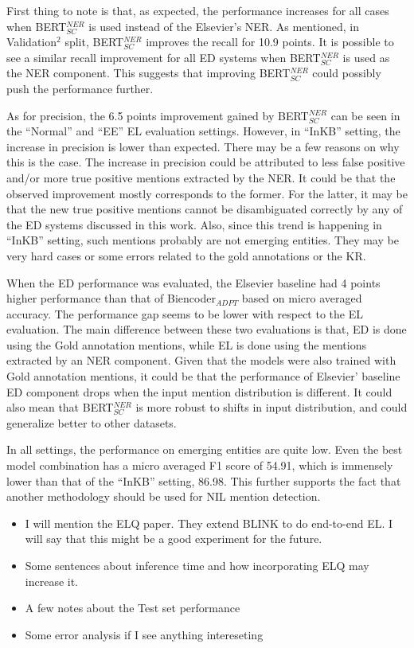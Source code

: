 \documentclass{report}
\theoremstyle{definition}
\theoremstyle{remark}
\begin{document}
First thing to note is that, as expected, the performance increases for all cases when BERT$_{SC}^{NER}$ is used instead of the Elsevier's NER. As mentioned, in Validation$^2$ split, BERT$_{SC}^{NER}$ improves the recall for 10.9 points. It is possible to see a similar recall improvement for all ED systems when BERT$_{SC}^{NER}$ is used as the NER component. This suggests that improving BERT$_{SC}^{NER}$ could possibly push the performance further. 

As for precision, the 6.5 points improvement gained by BERT$_{SC}^{NER}$ can be seen in the ``Normal'' and ``EE'' EL evaluation settings. However, in ``InKB'' setting, the increase in precision is lower than expected. There may be a few reasons on why this is the case. The increase in precision could be attributed to less false positive and/or more true positive mentions extracted by the NER. It could be that the observed improvement mostly corresponds to the former. For the latter, it may be that the new true positive mentions cannot be disambiguated correctly by any of the ED systems discussed in this work. Also, since this trend is happening in ``InKB'' setting, such mentions probably are not emerging entities. They may be very hard cases or some errors related to the gold annotations or the KR.

When the ED performance was evaluated, the Elsevier baseline had 4 points higher performance than that of Biencoder$_{ADPT}$ based on micro averaged accuracy. The performance gap seems to be lower with respect to the EL evaluation. The main difference between these two evaluations is that, ED is done using the Gold annotation mentions, while EL is done using the mentions extracted by an NER component. Given that the models were also trained with Gold annotation mentions, it could be that the performance of Elsevier' baseline ED component drops when the input mention distribution is different. It could also mean that BERT$^{NER}_{SC}$ is more robust to shifts in input distribution, and could generalize better to other datasets.

In all settings, the performance on emerging entities are quite low. Even the best model combination has a micro averaged F1 score of 54.91, which is immensely lower than that of the ``InKB'' setting, 86.98. This further supports the fact that another methodology should be used for NIL mention detection.


\begin{itemize}
    \item I will mention the ELQ paper. They extend BLINK to do end-to-end EL. I will say that this might be a good experiment for the future.
    \item Some sentences about inference time and how incorporating ELQ may increase it.
    \item A few notes about the Test set performance
    \item Some error analysis if I see anything intereseting
\end{itemize}
\end{document}
